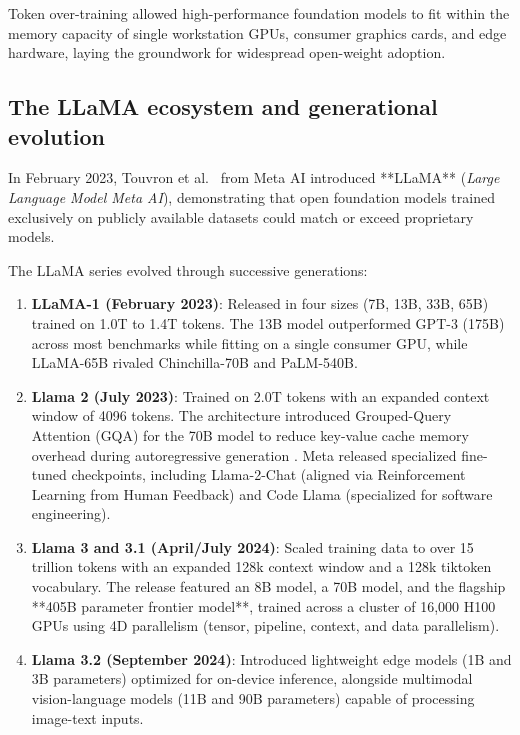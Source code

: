 \documentclass[../../main.tex]{subfiles}
\begin{document}
Token over-training allowed high-performance foundation models to fit within the memory capacity of single workstation GPUs, consumer graphics cards, and edge hardware, laying the groundwork for widespread open-weight adoption.


\subsection{The LLaMA ecosystem and generational evolution}
\label{subsec:llama_family}

In February 2023, Touvron et al.~\cite{touvron2023llama} from Meta AI introduced **LLaMA** (\emph{Large Language Model Meta AI}), demonstrating that open foundation models trained exclusively on publicly available datasets could match or exceed proprietary models.

The LLaMA series evolved through successive generations:
\begin{enumerate}
    \item \textbf{LLaMA-1 (February 2023)}: Released in four sizes (7B, 13B, 33B, 65B) trained on 1.0T to 1.4T tokens. The 13B model outperformed GPT-3 (175B) across most benchmarks while fitting on a single consumer GPU, while LLaMA-65B rivaled Chinchilla-70B and PaLM-540B.
    
    \item \textbf{Llama 2 (July 2023)}: Trained on 2.0T tokens with an expanded context window of 4096 tokens. The architecture introduced Grouped-Query Attention (GQA) for the 70B model to reduce key-value cache memory overhead during autoregressive generation \cite{touvron2023llama2}. Meta released specialized fine-tuned checkpoints, including Llama-2-Chat (aligned via Reinforcement Learning from Human Feedback) and Code Llama (specialized for software engineering).
    
    \item \textbf{Llama 3 and 3.1 (April/July 2024)}: Scaled training data to over 15 trillion tokens with an expanded 128k context window and a 128k tiktoken vocabulary. The release featured an 8B model, a 70B model, and the flagship **405B parameter frontier model**, trained across a cluster of 16,000 H100 GPUs using 4D parallelism (tensor, pipeline, context, and data parallelism).
    
    \item \textbf{Llama 3.2 (September 2024)}: Introduced lightweight edge models (1B and 3B parameters) optimized for on-device inference, alongside multimodal vision-language models (11B and 90B parameters) capable of processing image-text inputs.
\end{enumerate}
\end{document}
